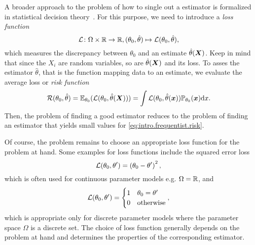A broader approach to the problem of how to single out a  estimator is formalized in statistical decision theory~\cite{Casella_2008_Statistical,Lehmann_1998_Theory}.
For this purpose, we need to introduce a \emph{loss function}
\[
  \label{eq:intro.frequentist.loss_function}
  \mathcal{L}\colon \Omega \times \mathbb{R} \to \mathbb{R},  (\theta_0, \hat{\theta}) \mapsto \mathcal{L}(\theta_0, \hat{\theta}),
\]
which measures the discrepancy between $\theta_0$ and an estimate $\hat{\theta}({\boldsymbol{X}})$.
Keep in mind that since the $X_i$ are random variables, so are $\hat{\theta}({\boldsymbol{X}})$ and its loss.
To asses the estimator $\hat\theta$, that is the function mapping data to an estimate, we evaluate the average loss or \emph{risk function}
\[
  \label{eq:intro.frequentist.risk}
  \mathcal{R}(\theta_0, \hat\theta) = \mathbb{E}_{\theta_0}(\mathcal{L}(\theta_0, \hat\theta({\boldsymbol{X}})))
  = \int \mathcal{L}(\theta_0, \hat\theta({\boldsymbol{x}})) \mathbb{P}_{\theta_0}({\boldsymbol{x}}) \mathrm{d} x.
\]
Then, the problem of finding a good estimator reduces to the problem of finding an estimator that yields small values for \cref{eq:intro.frequentist.risk}.

Of course, the problem remains to choose an appropriate loss function for the problem at hand.
Some examples for loss functions include the squared error loss
\[
  \mathcal{L}(\theta_0, \theta') = \left( \theta_0 - \theta' \right)^2,
  \label{eq:intro.frequentist.l2loss}
\]
which is often used for continuous parameter models e.g. $\Omega = \mathbb{R}$, and
\[
  \mathcal{L}(\theta_0, \theta') =
  \begin{cases}
    1 & \theta_0 = \theta' \\
    0 & \mathrm{otherwise}
  \end{cases},
  \label{eq:intro.frequentist.01loss}
\]
which is appropriate only for discrete parameter models where the parameter space $\Omega$ is a discrete set.
The choice of loss function generally depends on the problem at hand and determines the properties of the corresponding estimator.\\



